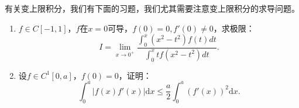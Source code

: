     有关变上限积分，我们有下面的习题，我们尤其需要注意变上限积分的求导问题。
    \begin{exercise}
        \begin{enumerate}
            \item $f\in C\left[-1,1\right]$，$f$在$x=0$可导，$f(0)=0,f'(0)\neq0$，求极限：$$I=\lim\limits_{x\rightarrow0^+}\dfrac{\displaystyle \int_{0}^{x}(x^2-t^2)f(t)dt}{\displaystyle \int_{0}^{x}tf(x^2-t^2)dt}.$$
            \item 设$f\in C^1\left[0,a\right]$，$f(0)=0$，证明：\[\int_{0}^{a}\vert  f(x)f'(x)\vert\mathrm{d}x\leq\frac{a}{2}\int_{0}^{a}(f'(x))^2\mathrm{d}x.\]
        \end{enumerate}
    \end{exercise}